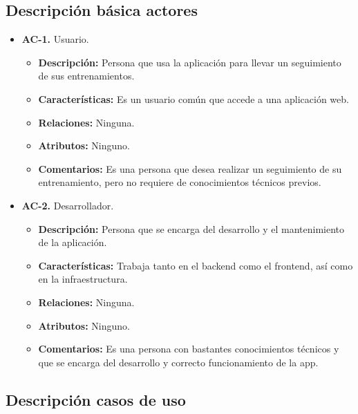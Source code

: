 \subsection {Descripción básica actores}
\begin{itemize}
  \item \textbf{AC-1.} Usuario.
  \begin{itemize}
    \item \textbf{Descripción: }Persona que usa la aplicación para llevar un seguimiento de sus entrenamientos.
    \item \textbf{Características:} Es un usuario común que accede a una aplicación web.
    \item \textbf{Relaciones:} Ninguna.
    \item \textbf{Atributos:} Ninguno.
    \item \textbf{Comentarios:} Es una persona que desea realizar un seguimiento de su entrenamiento, pero no requiere de conocimientos técnicos previos.
  \end{itemize}
  \item \textbf{AC-2.} Desarrollador.
    \begin{itemize}
    \item \textbf{Descripción:} Persona que se encarga del desarrollo y el mantenimiento de la aplicación.
    \item \textbf{Características:} Trabaja tanto en el backend como el frontend, así como en la infraestructura.
    \item \textbf{Relaciones:} Ninguna.
    \item \textbf{Atributos:} Ninguno.
    \item \textbf{Comentarios:} Es una persona con bastantes conocimientos técnicos y que se encarga del desarrollo y correcto funcionamiento de la app.
  \end{itemize}
\end{itemize}
\newpage

\subsection {Descripción casos de uso}

